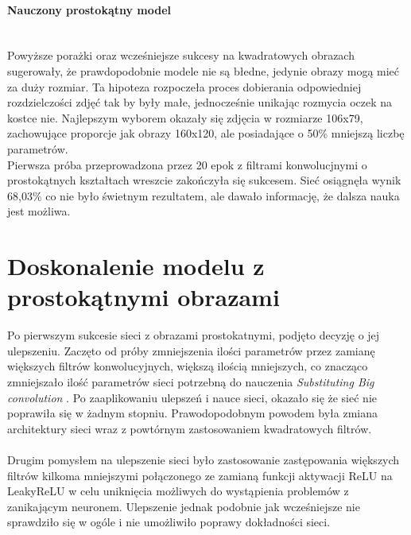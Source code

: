 \paragraph{Nauczony prostokątny model} \mbox{}\\
Powyższe porażki oraz wcześniejsze sukcesy na kwadratowych obrazach sugerowały, że
prawdopodobnie modele nie są błedne, jedynie obrazy mogą mieć za duży rozmiar. Ta hipoteza
rozpoczeła proces dobierania odpowiedniej rozdzielczości zdjęć tak by były małe, jednocześnie
unikając rozmycia oczek na kostce nie. Najlepszym wyborem okazały się zdjęcia w rozmiarze 106x79,
zachowujące proporcje jak obrazy 160x120, ale posiadające o 50\% mniejszą liczbę parametrów.\\
Pierwsza próba przeprowadzona przez 20 epok z filtrami konwolucjnymi o prostokątnych
kształtach wreszcie zakończyła się sukcesem. Sieć osiągnęła wynik 68,03\% co nie
było świetnym rezultatem, ale dawało informację, że dalsza nauka jest możliwa.

\section{Doskonalenie modelu z prostokątnymi obrazami}
Po pierwszym sukcesie sieci z obrazami prostokatnymi, podjęto decyzję o jej ulepszeniu.
Zaczęto od próby zmniejszenia ilości parametrów przez zamianę większych filtrów konwolucyjnych,
większą ilością mniejszych, co znacząco zmniejszało ilość parametrów sieci potrzebną do nauczenia
\textit{Substituting Big convolution} \cite{substBigConv}.
Po zaaplikowaniu ulepszeń i nauce sieci, okazało się że sieć nie poprawiła się w żadnym
stopniu. Prawodopodobnym powodem była zmiana architektury sieci wraz z powtórnym
zastosowaniem kwadratowych filtrów.\\\\
Drugim pomysłem na ulepszenie sieci było zastosowanie zastępowania większych filtrów
kilkoma mniejszymi połączonego ze zamianą funkcji aktywacji ReLU na LeakyReLU w celu uniknięcia
możliwych do wystąpienia problemów z zanikającym neuronem. Ulepszenie jednak podobnie
jak wcześniejsze nie sprawdziło się w ogóle i nie umożliwiło poprawy dokładności sieci.

